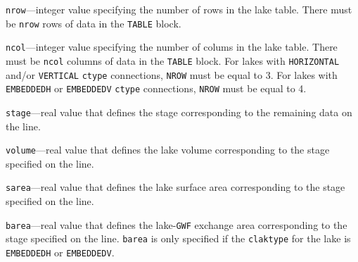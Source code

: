 
\item \texttt{nrow}---integer value specifying the number of rows in the lake table. There must be \texttt{nrow} rows of data in the \texttt{TABLE} block.

\item \texttt{ncol}---integer value specifying the number of colums in the lake table. There must be \texttt{ncol} columns of data in the \texttt{TABLE} block. For lakes with \texttt{HORIZONTAL} and/or \texttt{VERTICAL} \texttt{ctype} connections, \texttt{NROW} must be equal to 3. For lakes with \texttt{EMBEDDEDH} or \texttt{EMBEDDEDV} \texttt{ctype} connections, \texttt{NROW} must be equal to 4.

\item \texttt{stage}---real value that defines the stage corresponding to the remaining data on the line.

\item \texttt{volume}---real value that defines the lake volume corresponding to the stage specified on the line.

\item \texttt{sarea}---real value that defines the lake surface area corresponding to the stage specified on the line.

\item \texttt{barea}---real value that defines the lake-\texttt{GWF} exchange area corresponding to the stage specified on the line. \texttt{barea} is only specified if the \texttt{claktype} for the lake is \texttt{EMBEDDEDH} or \texttt{EMBEDDEDV}.


